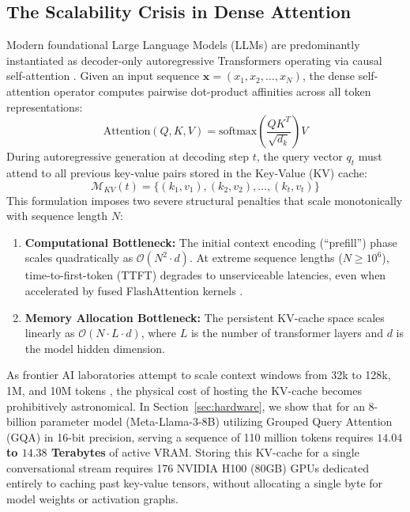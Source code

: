 \documentclass[11pt,a4paper]{article}
\begin{document}
\subsection{The Scalability Crisis in Dense Attention}
Modern foundational Large Language Models (LLMs) are predominantly instantiated as decoder-only autoregressive Transformers operating via causal self-attention \cite{vaswani2017attention}. Given an input sequence $\mathbf{x} = (x_1, x_2, \dots, x_N)$, the dense self-attention operator computes pairwise dot-product affinities across all token representations:
\begin{equation}
\text{Attention}(Q, K, V) = \text{softmax}\left(\frac{QK^T}{\sqrt{d_k}}\right)V
\end{equation}
During autoregressive generation at decoding step $t$, the query vector $q_t$ must attend to all previous key-value pairs stored in the Key-Value (KV) cache:
\begin{equation}
\mathcal{M}_{KV}(t) = \{(k_1, v_1), (k_2, v_2), \dots, (k_t, v_t)\}
\end{equation}
This formulation imposes two severe structural penalties that scale monotonically with sequence length $N$:
\begin{enumerate}
    \item \textbf{Computational Bottleneck:} The initial context encoding (``prefill'') phase scales quadratically as $\mathcal{O}(N^2 \cdot d)$. At extreme sequence lengths ($N \ge 10^6$), time-to-first-token (TTFT) degrades to unserviceable latencies, even when accelerated by fused FlashAttention kernels \cite{dao2022flashattention}.
    \item \textbf{Memory Allocation Bottleneck:} The persistent KV-cache space scales linearly as $\mathcal{O}(N \cdot L \cdot d)$, where $L$ is the number of transformer layers and $d$ is the model hidden dimension.
\end{enumerate}

As frontier AI laboratories attempt to scale context windows from 32k to 128k, 1M, and 10M tokens \cite{gemini2024}, the physical cost of hosting the KV-cache becomes prohibitively astronomical. In Section~\ref{sec:hardware}, we show that for an 8-billion parameter model (Meta-Llama-3-8B) utilizing Grouped Query Attention (GQA) in 16-bit precision, serving a sequence of 110 million tokens requires \textbf{$14.04$ to $14.38$ Terabytes} of active VRAM. Storing this KV-cache for a single conversational stream requires 176 NVIDIA H100 (80GB) GPUs dedicated entirely to caching past key-value tensors, without allocating a single byte for model weights or activation graphs.
\end{document}
